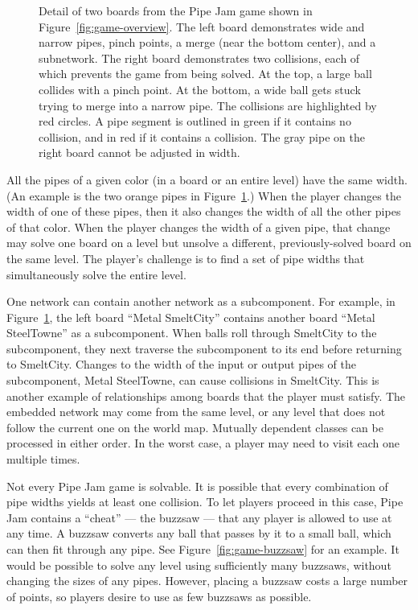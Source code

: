 \documentclass[preprint]{sig-alternate}
\newcommand{\figref}[1]{Figure~\ref{#1}}
\newcommand{\todo}[1]{\relax}
\let\Description =\description
\def\Nospacing{\itemsep=0pt\topsep=0pt\partopsep=0pt\parskip=0pt\parsep=0pt}
\renewenvironment{description}{\Description\Nospacing}{\endlist}
\begin{document}
\begin{description}
\begin{figure}
\caption{
  Detail of two boards from the Pipe Jam game shown in
  \figref{fig:game-overview}.  The left board demonstrates wide and
  narrow pipes, pinch points, a merge (near the bottom center), and a
  subnetwork.  The right board demonstrates two collisions, each of which
  prevents the game from being solved.  At the top, a large ball
  collides with a pinch point.  At the bottom, a wide ball gets stuck
  trying to merge into a narrow pipe.  The collisions are highlighted by
  red circles.  A pipe segment is outlined in green if it contains  no
  collision, and in red if it contains a collision.
  The gray pipe on the right board cannot be adjusted in width.
}
\label{fig:game-detail}
\end{figure}


\item[Linked pipes]
  All the pipes of a given color (in a board or an entire level) have the
  same width.
  (An example is the two orange pipes in \figref{fig:game-detail}.)
  When the player changes the width of one of these pipes,
  then it also changes the width of all the other pipes of that color.
  When the player changes the width of a given pipe, that change may solve
  one board on a level but unsolve a different, previously-solved board on
  the same level.  The player's challenge is to find a set of pipe widths
  that simultaneously solve the entire level.

\item[Embedded networks]
  One network can contain another network as a subcomponent.  For example,
  in \figref{fig:game-detail}, the left board ``Metal SmeltCity''
  contains another board ``Metal SteelTowne'' as a subcomponent.  When
  balls roll through SmeltCity to the subcomponent, they next traverse the
  subcomponent to its end before returning to SmeltCity.  Changes to the
  width of the input or output pipes of the subcomponent, Metal SteelTowne,
  can cause collisions in SmeltCity.  This is another example of
  relationships among boards that the player must satisfy.
  The embedded network may come from the same level, or any level that
  does not follow the current one on the world map.  Mutually dependent
  classes can be processed in either order.  In the worst case, a player
  may need to visit each one multiple times.

\item[Buzzsaws:  Exceptions to the laws of physics]
  Not every Pipe Jam game is solvable.  It is possible that every
  combination of pipe widths yields at least one collision.  To let players
  proceed in this case, Pipe Jam contains a ``cheat'' --- the buzzsaw ---
  that any player is allowed to use at any time.  A buzzsaw converts any
  ball that passes by it to a small ball, which can then fit through any
  pipe.  See \figref{fig:game-buzzsaw} for an example.
  It would be possible to solve any level using sufficiently many buzzsaws,
  without changing the sizes of any pipes.  However, placing a buzzsaw
  costs a large number of points, so players desire to use as few buzzsaws
  as possible.
  \todo{I think this last sentence is the first mention of
    points. Maybe this should be introduced earlier?}


\end{description}
\end{document}
